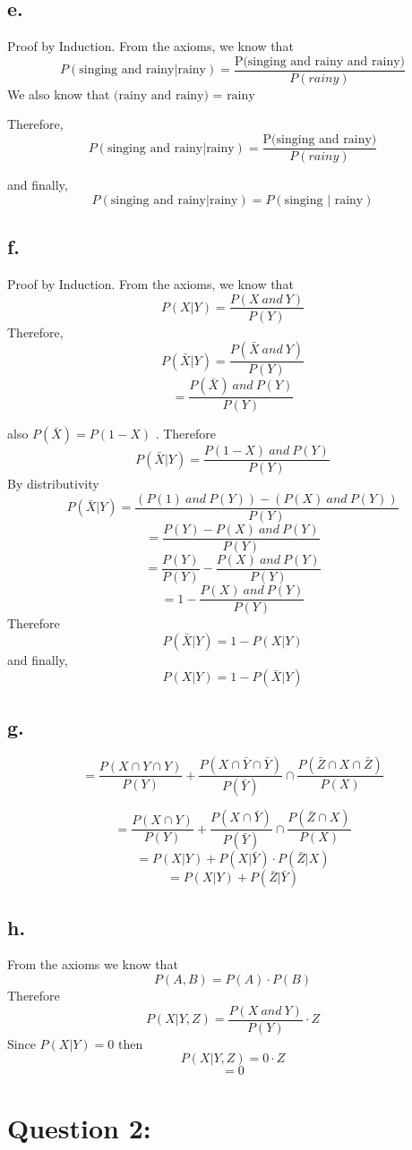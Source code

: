 \documentclass[a4paper,12pt]{article}
\begin{document}
\subsection*{e. }
Proof by Induction.$ $
From the axioms, we know that $$P(\textrm{singing and rainy$|$rainy}) = \frac{\textrm{P(singing and rainy and rainy)}}{P(rainy)}$$
We also know that $\textrm{(rainy and rainy) = rainy} $

Therefore,
$$P(\textrm{singing and rainy$|$rainy}) =\frac{\textrm{P(singing and rainy)}}{P(rainy)} $$

and finally, $$P(\textrm{singing and rainy$|$rainy}) =P(\textrm{singing $|$ rainy})$$

\subsection*{f. }
Proof by Induction.$ $
From the axioms, we know that $$P(X | Y) = \frac{P(X \:and\:Y)}{P(Y)}$$ 
Therefore, $$P(\bar{X} | Y) = \frac{P(\bar{X} \:and\:Y)}{P(Y)}$$ 
$$ = \frac{P(\bar{X})\:and\:P(Y)}{P(Y)}$$ 

also $P(\bar{X}) = P(1 - X)$ . Therefore
$$P(\bar{X} | Y) = \frac{P(1 - X) \:and\:P(Y)}{P(Y)}$$
By distributivity
$$ P(\bar{X} | Y)  = \frac{(P(1)\:and\:P(Y)) - (P(X)\:and\:P(Y))}{P(Y)}$$
$$  = \frac{P(Y) - P(X)\:and\:P(Y)}{P(Y)}$$
$$  =\frac{P(Y)}{P(Y)} - \frac{P(X)\:and\:P(Y)}{P(Y)}$$
$$  = 1 - \frac{P(X)\:and\:P(Y)}{P(Y)}$$
Therefore
$$P(\bar{X} | Y) = 1- P(X | Y) $$
and finally,
$$P(X| Y) = 1- P(\bar{X} | Y) $$
\subsection*{g. }
$$= \frac{P(X \cap Y \cap Y)}{P(Y)} +\frac{P(X \cap \bar{Y} \cap \bar{Y})}{P(\bar{Y})} \cap \frac{P(\bar{Z} \cap X \cap \bar{Z})}{P(X)} $$ 

$$ =\frac{P(X \cap Y)}{P(Y)} + \frac{P(X \cap \bar{Y})}{P(\bar{Y})} \cap \frac{P(\bar{Z} \cap X)}{P(X)}$$
$$ = P(X | Y) + P(X | \bar{Y}) \cdot P(\bar{Z} | X)$$
$$ = P(X | Y) + P(\bar{Z} | \bar{Y})$$

\subsection*{h. }
From the axioms we know that $$P(A,B) = P(A) \cdot P(B)$$
Therefore
$$P(X|Y,Z) =  \frac{P(X \:and\:Y)}{P(Y)} \cdot Z$$
Since $P(X|Y) = 0$ then
$$P(X|Y,Z) =  0 \cdot Z$$
$$ = 0$$
\section*{Question 2: }
\end{document}
